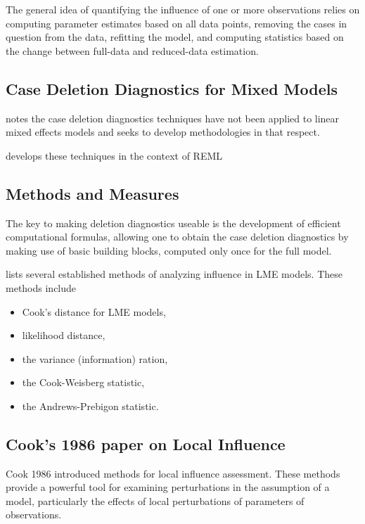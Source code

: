 \documentclass[12pt, a4paper]{article}
\begin{document}
The general idea of quantifying the influence of one or more observations relies on computing parameter estimates based on all data points, removing the cases in question from the data, refitting the model, and computing statistics based on the change between full-data and reduced-data estimation. 




\subsection{Case Deletion Diagnostics for Mixed Models}

\citet{Christiansen} notes the case deletion diagnostics techniques have not been applied to linear mixed effects models and seeks to develop methodologies in that respect.

\citet{Christiansen} develops these techniques in the context of REML

\subsection{Methods and Measures}
The key to making deletion diagnostics useable is the development of efficient computational formulas, allowing one to obtain the  case deletion diagnostics by making use of basic building blocks, computed only once for the full model.

\citet{Zewotir} lists several established methods of analyzing influence in LME models. These methods include \begin{itemize}
	\item Cook's distance for LME models,
	\item {} likelihood distance,
	\item the variance (information) ration,
	\item the  Cook-Weisberg statistic,
	\item the  Andrews-Prebigon statistic.
\end{itemize}


\subsection{Cook's 1986 paper on Local Influence}%
Cook 1986 introduced methods for local influence assessment. These methods provide a powerful tool for examining perturbations in the assumption of a model, particularly the effects of local perturbations of parameters of observations.
\end{document}
